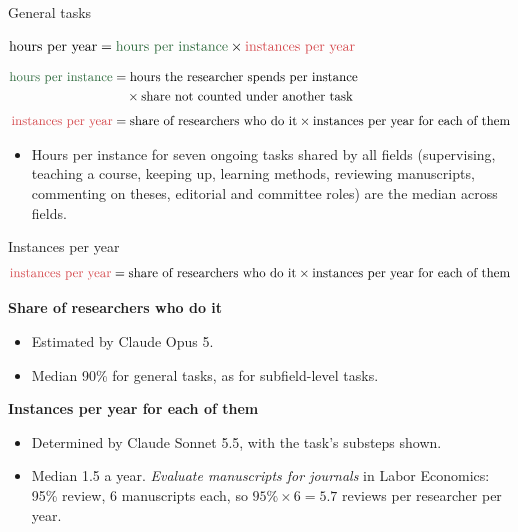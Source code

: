 \documentclass[aspectratio=169,11pt]{beamer}
\newcommand{\HI}[1]{{\color{lagreen}#1}}        %
\newcommand{\IY}[1]{{\color{lared}#1}}          %
\newcommand{\tx}[1]{\text{#1}}
\newcommand{\divider}{\par\vspace{0.3em}{\color{lablue!30}\rule{\linewidth}{1pt}}\par\vspace{0.2em}}
\newcommand{\desc}[1]{{\color{lablue!70}#1}}
\begin{document}
\begin{frame}{General tasks}
\vfill
\begin{center}
$\tx{hours per year} = \HI{\tx{hours per instance}} \times \IY{\tx{instances per year}}$
\end{center}
\vspace{0.6em}
\small
\begin{align*}
\HI{\tx{hours per instance}} &= \tx{hours the researcher spends per instance}\\
&\quad\times \tx{share not counted under another task}\\[0.4em]
\IY{\tx{instances per year}} &= \tx{share of researchers who do it} \times \tx{instances per year for each of them}
\end{align*}
\vspace{0.4em}
\begin{itemize}
  \item Hours per instance for seven ongoing tasks shared by all fields (supervising, teaching a course, keeping up,
  learning methods, reviewing manuscripts, commenting on theses, editorial and committee roles) are the median across
  fields.
\end{itemize}
\vfill
\end{frame}

\begin{frame}{\IY{Instances per year}}
\begingroup\small
\[
\IY{\tx{instances per year}} = \tx{share of researchers who do it} \times \tx{instances per year for each of them}
\]
\endgroup
\vspace{-0.8em}
\divider
\small
\textbf{Share of researchers who do it}
\begin{itemize}
  \item Estimated by Claude Opus 5.
  \item \desc{Median 90\% for general tasks, as for subfield-level tasks.}
\end{itemize}
\vspace{0.1em}
\textbf{Instances per year for each of them}
\begin{itemize}
  \item Determined by Claude Sonnet 5.5, with the task's substeps shown.
  \item \desc{Median 1.5 a year. \emph{Evaluate manuscripts for journals} in Labor Economics: 95\% review, 6 manuscripts
  each, so $95\% \times 6 = 5.7$ reviews per researcher per year.}
\end{itemize}
\end{frame}
\end{document}
